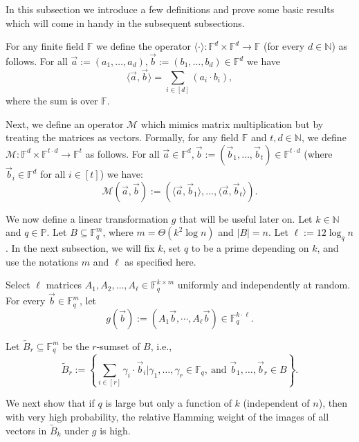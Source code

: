 \documentclass[10pt,a4paper]{article}
\newcommand{\F}{\mathbb{F}}
\renewcommand{\tilde}{\widetilde}
\newcommand{\M}{\mathcal{M}}
\begin{document}
  In this subsection we introduce a few definitions and prove some basic results which will come in handy in the subsequent subsections. 


For any finite field $\F$ we define the operator $\langle\cdot \rangle:\F^d\times \F^d\to \F$ (for every $d\in\mathbb{N}$) as follows. For all $\vec{a}:=(a_1,\ldots,a_d),\vec{b}:=(b_1,\ldots,b_d)\in\F^d$ we have $$
 \langle \vec{a},\vec{b}\rangle=\sum_{i\in[d]}\left(a_i\cdot b_i\right),
$$
where the sum is over $\F$. 

Next, we define an operator $\M$ which mimics matrix multiplication but by treating the matrices as vectors. Formally, for any field $\F$ and  $t,d\in\mathbb{N}$, we define $\M:\F^{d}\times \F^{t\cdot d}\to \F^t$ as follows. For all $\vec{a}\in \F^d,\vec{b}:=(\vec{b}_1,\ldots,\vec{b}_{t})\in\F^{t\cdot d}$ (where $\vec{b}_i\in\F^d$ for all $i\in[t]$) we have:
$$
\M(\vec{a},\vec{b}):=\left(\langle \vec{a},\vec{b}_1\rangle,\ldots ,\langle \vec{a},\vec{b}_t\rangle\right).
$$



 


We now define a linear transformation $g$ that will be useful later on. 
Let $k\in\mathbb{N}$ and $q\in\mathbb{P}$. Let $B\subseteq \F_q^m$, where $m=\Theta(k^2\log n)$ and $|B|=n$.  Let $\ell:=12\log_q n$. In the next subsection, we will fix $k$, set $q$ to be a prime depending on $k$, and use the notations $m$ and  $\ell$ as specified here. 


Select $\ell$ matrices $A_1,A_2,\ldots,A_\ell\in \mathbb{F}_q^{k\times m}$ uniformly and independently at random. For every  $\vec{b}\in \mathbb{F}_q^m$, let  
\[
g(\vec{b}):=(A_1\vec{b},\cdots,A_\ell\vec{b})\in\mathbb{F}_q^{k\cdot \ell}.
\]
 

   Let $\tilde{B}_r\subseteq \F_q^m$ be the $r$-sumset of $B$, i.e., $$\tilde{B}_r:=\left\{\sum_{i\in[r]}\gamma_i\cdot \vec{b}_i\bigg| \gamma_1,\ldots ,\gamma_r\in\F_q,\ \text{and }\vec{b}_1,\ldots,\vec{b}_r\in B\right\}.$$
   
   We next show that if $q$ is large but only a function of $k$ (independent of $n$), then with very high probability, the relative Hamming weight of the images of all vectors in $\tilde{B}_k$ under $g$ is high. 
  
\end{document}
